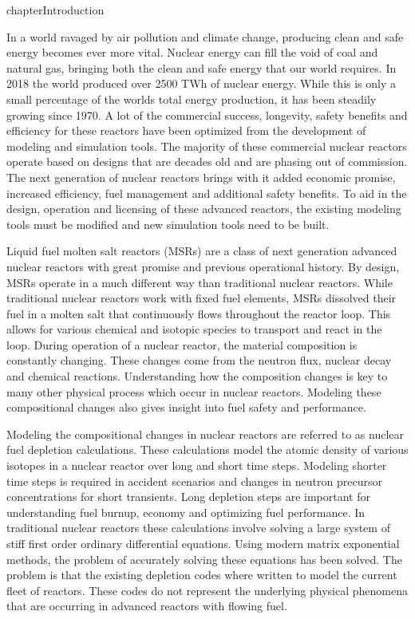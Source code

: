 chapter{Introduction} \label{ch:introduction}

In a world ravaged by air pollution and climate change, producing clean and safe energy becomes ever more vital. Nuclear energy can fill the void of coal and natural gas, bringing both the clean and safe energy that our world requires. In 2018 the world produced over 2500 TWh of nuclear energy. While this is only a small percentage of the worlds total energy production, it has been steadily growing since 1970. A lot of the commercial success, longevity, safety benefits and efficiency for these reactors have been optimized from the development of modeling and simulation tools. The majority of these commercial nuclear reactors operate based on designs that are decades old and are phasing out of commission. The next generation of nuclear reactors brings with it added economic promise, increased efficiency, fuel management and additional safety benefits. To aid in the design, operation and licensing of these advanced reactors, the existing modeling tools must be modified and new simulation tools need to be built. 
 
Liquid fuel molten salt reactors (MSRs) are a class of next generation advanced nuclear reactors with great promise and previous operational history. By design, MSRs operate in a much different way than traditional nuclear reactors. While traditional nuclear reactors work with fixed fuel elements, MSRs dissolved their fuel in a molten salt that continuously flows throughout the reactor loop. This allows for various chemical and isotopic species to transport and react in the loop. During operation of a nuclear reactor, the material composition is constantly changing. These changes come from the neutron flux, nuclear decay and chemical reactions. Understanding how the composition changes is key to many other physical process which occur in nuclear reactors. Modeling these compositional changes also gives insight into fuel safety and performance. 

Modeling the compositional changes in nuclear reactors are referred to as nuclear fuel depletion calculations. These calculations model the atomic density of various isotopes in a nuclear reactor over long and short time steps. Modeling shorter time steps is required in accident scenarios and changes in neutron precursor concentrations for short transients. Long depletion steps are important for understanding fuel burnup, economy and optimizing fuel performance. In traditional nuclear reactors these calculations involve solving a large system of stiff first order ordinary differential equations. Using modern matrix exponential methods, the problem of accurately solving these equations has been solved. The problem is that the existing depletion codes where written to model the current fleet of reactors. These codes do not represent the underlying physical phenomena that are occurring in advanced reactors with flowing fuel. 

